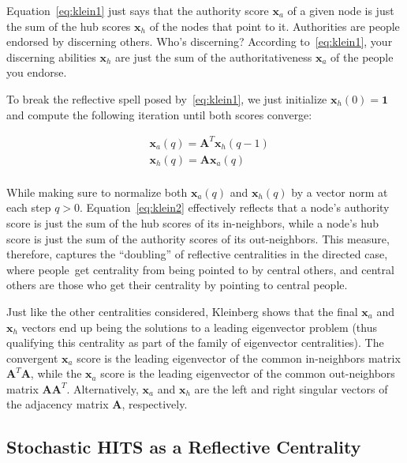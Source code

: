 \documentclass[a4paper,fleqn]{cas-sc}
\begin{document}
Equation~\ref{eq:klein1} just says that the authority score $\mathbf{x}_a$ of a given node is just the sum of the hub scores $\mathbf{x}_h$ of the nodes that point to it. Authorities are people endorsed by discerning others. Who's discerning? According to~\ref{eq:klein1}, your discerning abilities $\mathbf{x}_h$ are just the sum of the authoritativeness $\mathbf{x}_a$ of the people you endorse.

To break the reflective spell posed by~\ref{eq:klein1}, we just initialize $\mathbf{x}_h(0) = \mathbf{1}$ and compute the following iteration until both scores converge:

\begin{equation}
    \begin{split}
        &\mathbf{x}_a(q) = \mathbf{A}^T\mathbf{x}_h(q-1) \\
        &\mathbf{x}_h(q) = \mathbf{A}\mathbf{x}_a(q) \\
    \end{split}
    \label{eq:klein2}
\end{equation}

While making sure to normalize both $\mathbf{x}_a(q)$ and $\mathbf{x}_h(q)$ by a vector norm at each step $q > 0$. Equation~\ref{eq:klein2} effectively reflects that a node's authority score is just the sum of the hub scores of its in-neighbors, while a node's hub score is just the sum of the authority scores of its out-neighbors. This measure, therefore, captures the ``doubling'' of reflective centralities in the directed case, where people\ get centrality from being pointed to by central others, and central others are those who get their centrality by pointing to central people. 

Just like the other centralities considered, Kleinberg shows that the final $\mathbf{x}_a$ and $\mathbf{x}_h$ vectors end up being the solutions to a leading eigenvector problem (thus qualifying this centrality as part of the family of eigenvector centralities). The convergent $\mathbf{x}_a$ score is the leading eigenvector of the common in-neighbors matrix $\mathbf{A}^T\mathbf{A}$, while the $\mathbf{x}_a$ score is the leading eigenvector of the common out-neighbors matrix $\mathbf{A}\mathbf{A}^T$. Alternatively, $\mathbf{x}_a$ and $\mathbf{x}_h$ are the left and right singular vectors of the adjacency matrix $\mathbf{A}$, respectively.

\subsection{Stochastic HITS as a Reflective Centrality}


% 



\end{document}
